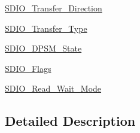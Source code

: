 \begin{DoxyCompactItemize}
\item 
\mbox{\hyperlink{group___s_d_i_o___transfer___direction}{S\+D\+I\+O\+\_\+\+Transfer\+\_\+\+Direction}}
\item 
\mbox{\hyperlink{group___s_d_i_o___transfer___type}{S\+D\+I\+O\+\_\+\+Transfer\+\_\+\+Type}}
\item 
\mbox{\hyperlink{group___s_d_i_o___d_p_s_m___state}{S\+D\+I\+O\+\_\+\+D\+P\+S\+M\+\_\+\+State}}
\item 
\mbox{\hyperlink{group___s_d_i_o___flags}{S\+D\+I\+O\+\_\+\+Flags}}
\item 
\mbox{\hyperlink{group___s_d_i_o___read___wait___mode}{S\+D\+I\+O\+\_\+\+Read\+\_\+\+Wait\+\_\+\+Mode}}
\end{DoxyCompactItemize}


\subsection{Detailed Description}
